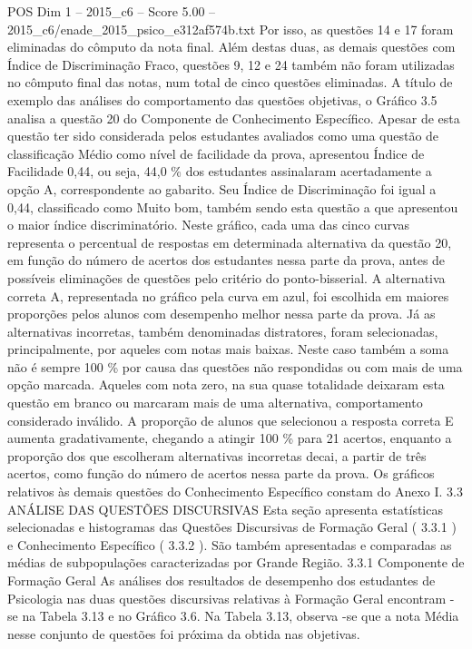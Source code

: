 \begin{textsample}{POS Dim 1 – 2015\_c6 – Score 5.00 – 2015\_c6/enade\_2015\_psico\_e312af574b.txt}
Por isso, as questões 14 e 17 foram eliminadas do cômputo da nota final.
Além destas duas, as demais questões com Índice de Discriminação Fraco, questões 9, 12 e 24 também não foram utilizadas no cômputo final das notas, num total de cinco questões eliminadas.
A título de exemplo das análises do comportamento das questões objetivas, o Gráfico 3.5 analisa a questão 20 do Componente de Conhecimento Específico.
Apesar de esta questão ter sido considerada pelos estudantes avaliados como uma questão de classificação Médio como nível de facilidade da prova, apresentou Índice de Facilidade 0,44, ou seja, 44,0 \% dos estudantes assinalaram acertadamente a opção A, correspondente ao gabarito.
Seu Índice de Discriminação foi igual a 0,44, classificado como Muito bom, também sendo esta questão a que apresentou o maior índice discriminatório.
Neste gráfico, cada uma das cinco curvas representa o percentual de respostas em determinada alternativa da questão 20, em função do número de acertos dos estudantes nessa parte da prova, antes de possíveis eliminações de questões pelo critério do ponto-bisserial.
A alternativa correta A, representada no gráfico pela curva em azul, foi escolhida em maiores proporções pelos alunos com desempenho melhor nessa parte da prova.
Já as alternativas incorretas, também denominadas distratores, foram selecionadas, principalmente, por aqueles com notas mais baixas.
Neste caso também a soma não é sempre 100 \% por causa das questões não respondidas ou com mais de uma opção marcada.
Aqueles com nota zero, na sua quase totalidade deixaram esta questão em branco ou marcaram mais de uma alternativa, comportamento considerado inválido.
A proporção de alunos que selecionou a resposta correta E aumenta gradativamente, chegando a atingir 100 \% para 21 acertos, enquanto a proporção dos que escolheram alternativas incorretas decai, a partir de três acertos, como função do número de acertos nessa parte da prova.
Os gráficos relativos às demais questões do Conhecimento Específico constam do Anexo I. 3.3 ANÁLISE DAS QUESTÕES DISCURSIVAS Esta seção apresenta estatísticas selecionadas e histogramas das Questões Discursivas de Formação Geral ( 3.3.1 ) e Conhecimento Específico ( 3.3.2 ).
São também apresentadas e comparadas as médias de subpopulações caracterizadas por Grande Região. 3.3.1 Componente de Formação Geral As análises dos resultados de desempenho dos estudantes de Psicologia nas duas questões discursivas relativas à Formação Geral encontram -se na Tabela 3.13 e no Gráfico 3.6.
Na Tabela 3.13, observa -se que a nota Média nesse conjunto de questões foi próxima da obtida nas objetivas.

\end{textsample}

